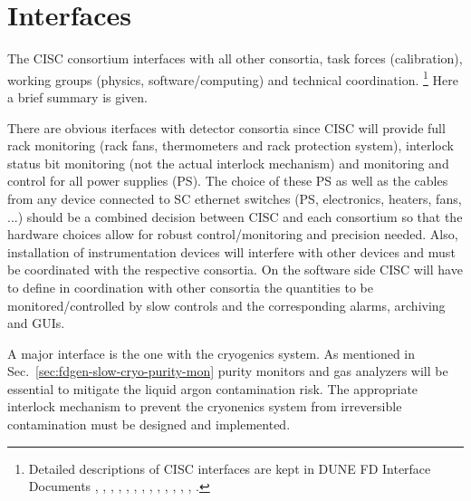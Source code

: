 \section{Interfaces}
\label{sec:fdgen-slow-cryo-intfc}


The CISC consortium interfaces with all other consortia, task forces (calibration), working groups (physics, software/computing) and technical coordination.
\footnote{
Detailed descriptions of CISC interfaces are kept in DUNE FD Interface Documents
 \cite{bib:docdb6745},
\cite{bib:docdb6991},
\cite{bib:docdb6790},
\cite{bib:docdb6787},
\cite{bib:docdb6784},
\cite{bib:docdb6781},
\cite{bib:docdb6760},
\cite{bib:docdb6679},
\cite{bib:docdb6730},
\cite{bib:docdb7126},
\cite{bib:docdb7099},
\cite{bib:docdb7072},
\cite{bib:docdb7045},
\cite{bib:docdb7018}.} Here a brief summary is given. 

There are obvious iterfaces with detector consortia since CISC will provide full rack monitoring (rack fans, thermometers and rack protection system),
interlock status bit monitoring (not the actual interlock mechanism) and monitoring and control for all power supplies (PS). The choice of these   
PS as well as the cables from any device connected to SC ethernet switches (PS, electronics, heaters, fans, ...)
should be a combined decision between CISC and each consortium so that the hardware choices allow for robust control/monitoring and precision needed.  
Also, installation of instrumentation devices will interfere with other devices and must be coordinated with the respective consortia.  
On the software side CISC will have to define in coordination with other consortia the quantities to be monitored/controlled by slow controls and the corresponding alarms,
archiving and GUIs. 



A major interface is the one with the cryogenics system. As mentioned in Sec.~\ref{sec:fdgen-slow-cryo-purity-mon} purity monitors and gas analyzers will be essential
to mitigate the liquid argon contamination risk. The appropriate interlock mechanism to prevent the cryonenics system from irreversible contamination
must be designed and implemented. 

